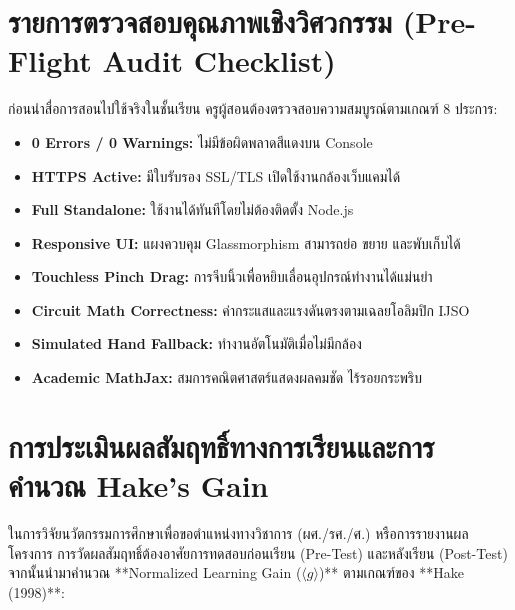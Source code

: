 \section{รายการตรวจสอบคุณภาพเชิงวิศวกรรม (Pre-Flight Audit Checklist)}
ก่อนนำสื่อการสอนไปใช้จริงในชั้นเรียน ครูผู้สอนต้องตรวจสอบความสมบูรณ์ตามเกณฑ์ 8 ประการ:
\begin{itemize}[leftmargin=1.5em, itemsep=3pt]
    \item [$\square$] \textbf{0 Errors / 0 Warnings:} ไม่มีข้อผิดพลาดสีแดงบน Console
    \item [$\square$] \textbf{HTTPS Active:} มีใบรับรอง SSL/TLS เปิดใช้งานกล้องเว็บแคมได้
    \item [$\square$] \textbf{Full Standalone:} ใช้งานได้ทันทีโดยไม่ต้องติดตั้ง Node.js
    \item [$\square$] \textbf{Responsive UI:} แผงควบคุม Glassmorphism สามารถย่อ ขยาย และพับเก็บได้
    \item [$\square$] \textbf{Touchless Pinch Drag:} การจีบนิ้วเพื่อหยิบเลื่อนอุปกรณ์ทำงานได้แม่นยำ
    \item [$\square$] \textbf{Circuit Math Correctness:} ค่ากระแสและแรงดันตรงตามเฉลยโอลิมปิก IJSO
    \item [$\square$] \textbf{Simulated Hand Fallback:} ทำงานอัตโนมัติเมื่อไม่มีกล้อง
    \item [$\square$] \textbf{Academic MathJax:} สมการคณิตศาสตร์แสดงผลคมชัด ไร้รอยกระพริบ
\end{itemize}

\section{การประเมินผลสัมฤทธิ์ทางการเรียนและการคำนวณ Hake's Gain}
ในการวิจัยนวัตกรรมการศึกษาเพื่อขอตำแหน่งทางวิชาการ (ผศ./รศ./ศ.) หรือการรายงานผลโครงการ การวัดผลสัมฤทธิ์ต้องอาศัยการทดสอบก่อนเรียน (Pre-Test) และหลังเรียน (Post-Test) จากนั้นนำมาคำนวณ **Normalized Learning Gain ($\langle g \rangle$)** ตามเกณฑ์ของ **Hake (1998)**:

